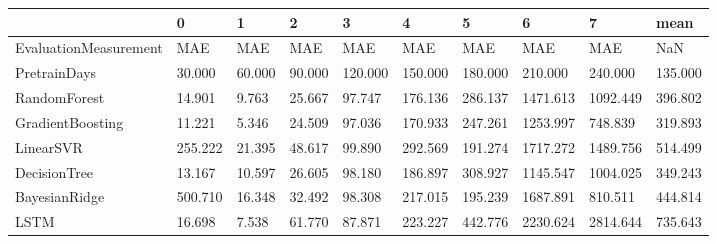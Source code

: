 \begin{tabular}{llllllllll}
\toprule
{} &       0 &      1 &      2 &       3 &       4 &       5 &        6 &        7 &    mean \\
\midrule
EvaluationMeasurement &     MAE &    MAE &    MAE &     MAE &     MAE &     MAE &      MAE &      MAE &     NaN \\
PretrainDays          &  30.000 & 60.000 & 90.000 & 120.000 & 150.000 & 180.000 &  210.000 &  240.000 & 135.000 \\
RandomForest          &  14.901 &  9.763 & 25.667 &  97.747 & 176.136 & 286.137 & 1471.613 & 1092.449 & 396.802 \\
GradientBoosting      &  11.221 &  5.346 & 24.509 &  97.036 & 170.933 & 247.261 & 1253.997 &  748.839 & 319.893 \\
LinearSVR             & 255.222 & 21.395 & 48.617 &  99.890 & 292.569 & 191.274 & 1717.272 & 1489.756 & 514.499 \\
DecisionTree          &  13.167 & 10.597 & 26.605 &  98.180 & 186.897 & 308.927 & 1145.547 & 1004.025 & 349.243 \\
BayesianRidge         & 500.710 & 16.348 & 32.492 &  98.308 & 217.015 & 195.239 & 1687.891 &  810.511 & 444.814 \\
LSTM                  &  16.698 &  7.538 & 61.770 &  87.871 & 223.227 & 442.776 & 2230.624 & 2814.644 & 735.643 \\
\bottomrule
\end{tabular}
